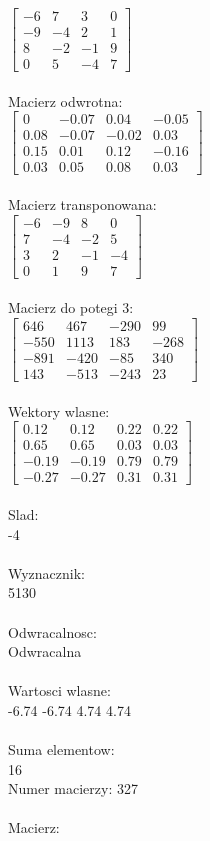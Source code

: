 \documentclass[a4paper,12pt]{article}
\begin{document}
$\begin{bmatrix} -6&7&3&0\\-9&-4&2&1\\8&-2&-1&9\\0&5&-4&7 \end{bmatrix}$
\\
\\
Macierz odwrotna:\\

$\begin{bmatrix} 0&-0.07&0.04&-0.05\\0.08&-0.07&-0.02&0.03\\0.15&0.01&0.12&-0.16\\0.03&0.05&0.08&0.03 \end{bmatrix}$
\\
\\
Macierz transponowana:\\

$\begin{bmatrix} -6&-9&8&0\\7&-4&-2&5\\3&2&-1&-4\\0&1&9&7 \end{bmatrix}$
\\
\\
Macierz do potegi 3:\\

$\begin{bmatrix} 646&467&-290&99\\-550&1113&183&-268\\-891&-420&-85&340\\143&-513&-243&23 \end{bmatrix}$
\\
\\
Wektory wlasne:\\

$\begin{bmatrix} 0.12&0.12&0.22&0.22\\0.65&0.65&0.03&0.03\\-0.19&-0.19&0.79&0.79\\-0.27&-0.27&0.31&0.31 \end{bmatrix}$
\\
\\
Slad:\\
-4
\\
\\
Wyznacznik:\\
5130
\\
\\
Odwracalnosc:\\
Odwracalna
\\
\\
Wartosci wlasne:\\
-6.74 -6.74 4.74 4.74
\\
\\
Suma elementow:\\
16
\\
\newpage
Numer macierzy:
327
\\
\\
Macierz:\\
\end{document}
